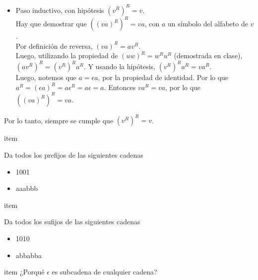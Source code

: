 \documentclass{article}
\begin{document}
\begin{enumerate}
{\begin{itemize}
{\begin{itemize}
                    \item {
                        Paso inductivo, con hipótesis $(v^R)^R = v$.\\
                        Hay que demostrar que $((va)^R)^R = va$, con $a$ un 
                        símbolo del alfabeto de $v$.\\
                        Por definición de reversa, $(va)^R = av^R$.\\
                        Luego, utilizando la propiedad de $(uw)^R = w^Ru^R$ 
                        (demostrada en clase), $(av^R)^R = (v^R)^Ra^R$.
                        Y usando la hipótesis, $(v^R)^Ra^R = va^R$.\\
                        Luego, notemos que $a = \epsilon a$, por la propiedad 
                        de identidad. Por lo que $a^R = (\epsilon a)^R = 
                        a  \epsilon^R = a \epsilon = a$.
                        Entonces $va^R = va$, por lo que $((va)^R)^R = va$.
                    }
                \end{itemize}
                Por lo tanto, siempre se cumple que $(v^R)^R = v$.
            }
        \end{itemize}
    }

    item {
        Da todos los prefijos de las siguientes cadenas

        \begin{itemize}
            \item {
                1001
            }

            \item {
                aaabbb
            }
        \end{itemize}
    }

    item {
        Da todos los sufijos de las siguientes cadenas

        \begin{itemize}
            \item {
                1010
            }

            \item {
                abbabba
            }
        \end{itemize}
    }

    item {
        ¿Porqué $\epsilon$ es subcadena de cualquier cadena?
    }

\end{enumerate}
    
\end{document}
